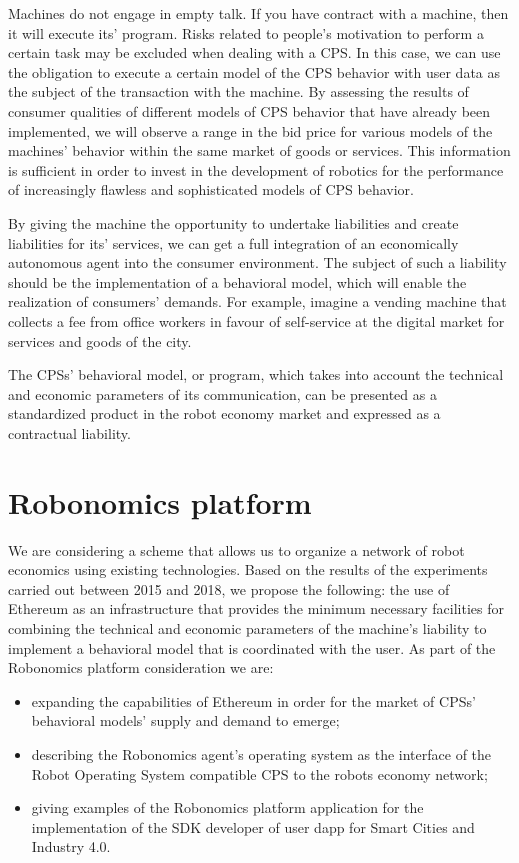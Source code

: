 \documentclass{article}
\begin{document}
Machines do not engage in empty talk. If you have contract with a machine, then it will execute its’ program. Risks related to people’s motivation to perform a certain task may be excluded when dealing with a CPS. In this case, we can use the obligation to execute a certain model of the CPS behavior with user data as the subject of the transaction with the machine. By assessing the results of consumer qualities of different models of CPS behavior that have already been implemented, we will observe a range in the bid price for various models of the machines’ behavior within the same market of goods or services. This information is sufficient in order to invest in the development of robotics for the performance of increasingly flawless and sophisticated models of CPS behavior.

By giving the machine the opportunity to undertake liabilities and create liabilities for its’ services, we can get a full integration of an economically autonomous agent into the consumer environment. The subject of such a liability should be the implementation of a behavioral model, which will enable the realization of consumers’ demands. For example, imagine a vending machine that collects a fee from office workers in favour of self-service at the digital market for services and goods of the city.

The CPSs’ behavioral model, or program, which takes into account the technical and economic parameters of its communication, can be presented as a standardized product in the robot economy market and expressed as a contractual liability.

\section{Robonomics platform}

We are considering a scheme that allows us to organize a network of robot economics using existing technologies. Based on the results of the experiments carried out between 2015 and 2018, we propose the following: the use of Ethereum as an infrastructure that provides the minimum necessary facilities for combining the technical and economic parameters of the machine's liability to implement a behavioral model that is coordinated with the user. As part of the Robonomics platform consideration we are:

\begin{itemize}[noitemsep]
	\item expanding the capabilities of Ethereum in order for the market of CPSs’ behavioral models’ supply and demand to emerge; 
	\item describing the Robonomics agent’s operating system as the interface of the Robot Operating System \cite{Quigley2009ROS:System} compatible CPS to the robots economy network;
	\item giving examples of the Robonomics platform application for the implementation of the SDK developer of user dapp for Smart Cities and Industry 4.0.
\end{itemize}
\end{document}
